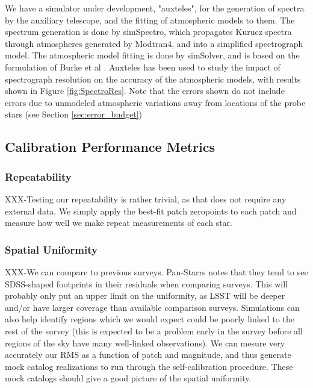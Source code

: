 \documentclass[12pt,preprint]{aastex}
\begin{document}
We have a simulator under development, "auxteles", for the generation of spectra by the auxiliary telescope, 
and the fitting of atmospheric 
models to them.  The spectrum generation is done by simSpectro, which propagates Kurucz spectra through
atmospheres generated by Modtran4, and into a simplified spectrograph model.  The atmospheric model fitting is done by
simSolver, and is based on the formulation of Burke et al \citep{ref:Burke2010b}.  Auxteles has been used to study
the impact of spectrograph resolution on the accuracy of the atmospheric models, with results shown in Figure \ref{fig:SpectroRes}.
Note that the errors shown do not include errors due to unmodeled atmospheric variations away from locations of the 
probe stars (see Section \ref{sec:error_budget})

\subsection{Calibration Performance Metrics}

\subsubsection{Repeatability}

XXX-Testing our repeatability is rather trivial, as that does not require
any external data.  We simply apply the best-fit patch zeropoints to
each patch and measure how well we make repeat measurements of each
star.

\subsubsection{Spatial Uniformity}

XXX-We can compare to previous surveys.  Pan-Starrs notes that they
tend to see SDSS-shaped footprints in their residuals when comparing
surveys.  This will probably only put an upper limit on the
uniformity, as LSST will be deeper and/or have larger coverage than
available comparison surveys.  Simulations can also help identify
regions which we would expect could be poorly linked to the rest of
the survey (this is expected to be a problem early in the survey
before all regions of the sky have many well-linked observations).  We
can mesure very accurately our RMS as a function of patch and
magnitude, and thus generate mock catalog realizations to run through
the self-calibration procedure.  These mock catalogs should give a
good picture of the spatial uniformity.
\end{document}
